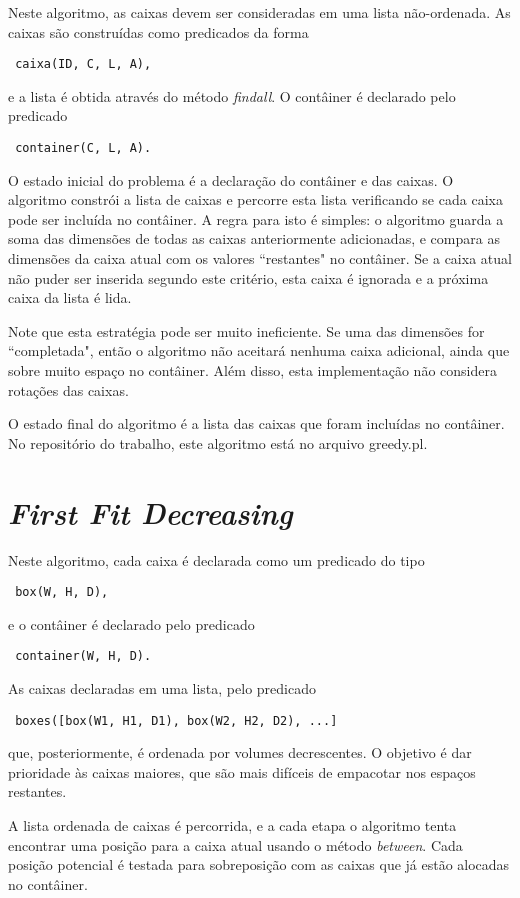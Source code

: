 \documentclass[12pt]{article}
\begin{document}
Neste algoritmo, as caixas devem ser consideradas em uma lista não-ordenada. As caixas são construídas como predicados da forma
\begin{verbatim} caixa(ID, C, L, A),
\end{verbatim}
e a lista é obtida através do método \emph{findall}. O contâiner é declarado pelo predicado
\begin{verbatim} container(C, L, A).
\end{verbatim}

O estado inicial do problema é a declaração do contâiner e das caixas. O algoritmo constrói a lista de caixas e percorre esta lista verificando se cada caixa pode ser incluída no contâiner. A regra para isto é simples: o algoritmo guarda a soma das dimensões de todas as caixas anteriormente adicionadas, e compara as dimensões da caixa atual com os valores ``restantes" no contâiner. Se a caixa atual não puder ser inserida segundo este critério, esta caixa é ignorada e a próxima caixa da lista é lida. 

Note que esta estratégia pode ser muito ineficiente. Se uma das dimensões for ``completada", então o algoritmo não aceitará nenhuma caixa adicional, ainda que sobre muito espaço no contâiner. Além disso, esta implementação não considera rotações das caixas. 

O estado final do algoritmo é a lista das caixas que foram incluídas no contâiner. No repositório do trabalho, este algoritmo está no arquivo greedy.pl. 

\section{\emph{First Fit Decreasing}}

Neste algoritmo, cada caixa é declarada como um predicado do tipo
\begin{verbatim} box(W, H, D),
\end{verbatim}
e o contâiner é declarado pelo predicado
\begin{verbatim} container(W, H, D).
\end{verbatim}
As caixas declaradas em uma lista, pelo predicado
\begin{verbatim} boxes([box(W1, H1, D1), box(W2, H2, D2), ...]
\end{verbatim}
que, posteriormente, é ordenada por volumes decrescentes. O objetivo é dar prioridade às caixas maiores, que são mais difíceis de empacotar nos espaços restantes. 

A lista ordenada de caixas é percorrida, e a cada etapa o algoritmo tenta encontrar uma posição para a caixa atual usando o método \emph{between}. Cada posição potencial é testada para sobreposição com as caixas que já estão alocadas no contâiner. 
\end{document}
